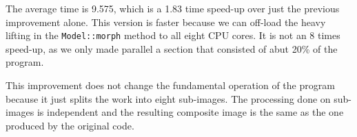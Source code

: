 \documentclass[12pt]{article}
\begin{document}
The average time is 9.575, which is a 1.83 time speed-up over just the previous improvement alone. This version
is faster because we can off-load the heavy lifting in the \texttt{Model::morph} method to all eight CPU cores. It is not an 8 times speed-up, as we only made parallel a section that consisted of abut 20\% of the program.

This improvement does not change the fundamental operation of the program because it just splits the work
into eight sub-images. The processing done on sub-images is independent and the resulting composite image is the same as the one produced by the original code.
\end{document}
